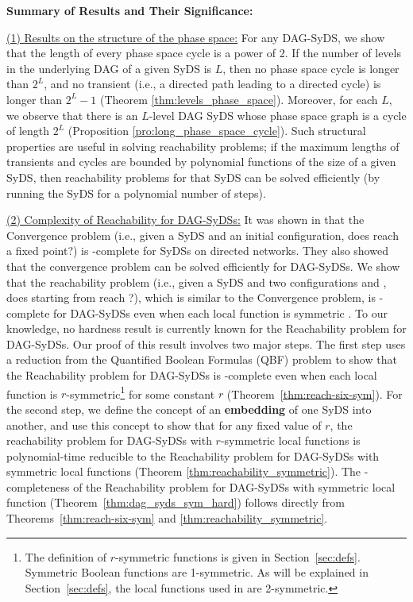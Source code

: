 \smallskip

\noindent
\textbf{Summary of Results and Their Significance:}

\smallskip

\noindent
\underline{(1) Results on the structure of the phase space:}
For any DAG-SyDS, we show that
the length of every phase space cycle is a power of 2.
If the number of levels in the underlying DAG of a given SyDS is $L$,
then no phase space cycle is longer than $2^L$,
and no transient (i.e., a directed path leading to a directed
cycle) is longer than $2^L-1$
(Theorem \ref{thm:levels_phase_space}).
Moreover, for each $L$, we observe that
there is an $L$-level DAG SyDS whose phase 
space graph is a cycle of length $2^L$
(Proposition \ref{pro:long_phase_space_cycle}).
Such structural properties are useful in solving 
reachability problems; if the maximum lengths of transients
and cycles are bounded by polynomial functions of the size of a given SyDS,
then reachability problems for that SyDS can be solved efficiently
(by running the SyDS for a polynomial number of steps).

\smallskip

\noindent
\underline{(2) Complexity of Reachability for DAG-SyDSs:}
It was shown in
\cite{Chistikov-etal-2020} that the Convergence problem
(i.e., given a SyDS \cals{} and an initial configuration,
does \cals{} reach a fixed point?) is \cpsp-complete
for SyDSs on directed networks.
They also showed that the convergence problem can be solved efficiently
for DAG-SyDSs.
We show that the reachability problem
(i.e., given a SyDS \cals{} and two configurations \calc{} and \cald{},
does \cals{} starting from \calc{} reach \cald{}?),
which is similar to the Convergence problem, 
is \cpsp-complete for DAG-SyDSs even
when each local function is symmetric \cite{Crama-Hammer-2011}.
To our knowledge, no hardness result is currently known for
the Reachability problem for DAG-SyDSs.
Our proof of this result involves two major steps.
The first step uses a reduction from the Quantified Boolean Formulas
(QBF) problem \cite{GJ-1979} to show that the Reachability problem for DAG-SyDSs is
\cpsp-complete even when each local function is 
$r$-symmetric\footnote{The definition of $r$-symmetric functions is given in
Section~\ref{sec:defs}. Symmetric Boolean functions
are 1-symmetric. As will be explained in Section~\ref{sec:defs},
the local functions used in \cite{Chistikov-etal-2020} are
2-symmetric.}
for some constant $r$ (Theorem~\ref{thm:reach-six-sym}).
For the second step,
we define the concept of an \textbf{embedding} of one SyDS into another,
and use this concept to show that
for any fixed value of $r$, 
the reachability problem for DAG-SyDSs with $r$-symmetric local functions 
is polynomial-time reducible to the Reachability problem for DAG-SyDSs with
symmetric  local functions (Theorem \ref{thm:reachability_symmetric}).
The \cpsp-completeness of the Reachability problem for DAG-SyDSs with 
symmetric local function (Theorem~\ref{thm:dag_syds_sym_hard})
follows directly from Theorems~\ref{thm:reach-six-sym} and 
\ref{thm:reachability_symmetric}.

